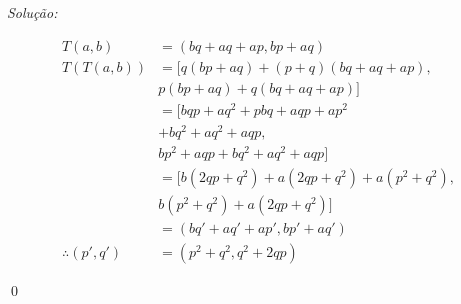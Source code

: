\documentclass[12pt]{article}
\newenvironment{problem}[2][Problema]{\begin{trivlist}
\item[\hskip \labelsep {\bfseries #1}\hskip \labelsep {\bfseries #2.}]}{\end{trivlist}}
\newenvironment{sol}
	{\emph{Solu\c c\~{a}o:}
	}
	{
		\qed
	}
\begin{document}
	\begin{problem}{1.19} 
	\end{problem}
	\begin{sol}

		\begin{equation*}
			\begin{split}
				T(a,b) &=(bq+aq+ap,bp+aq) \\
				T(T(a,b))&= [q(bp+aq)+(p+q)(bq+aq+ap), \\
					 & p(bp+aq)+q(bq+aq+ap)] \\
					 &= [bqp + aq^2 + pbq + aqp + ap^2 \\
					 &+ bq^2 + aq^2 + aqp,\\
					 & bp^2 + aqp + bq^2 + aq^2 + aqp] \\
					 &= [b(2qp + q^2) + a(2qp + q^2) + a(p^2 + q^2),  \\
					 & b(p^2 + q^2) + a(2qp + q^2)] \\
					&= (bq'+aq'+ap',bp'+aq') \\
					\therefore (p',q') &= (p^2+q^2,q^2+2qp)
			\end{split}
		\end{equation*}
	\end{sol}

	
\end{document}
